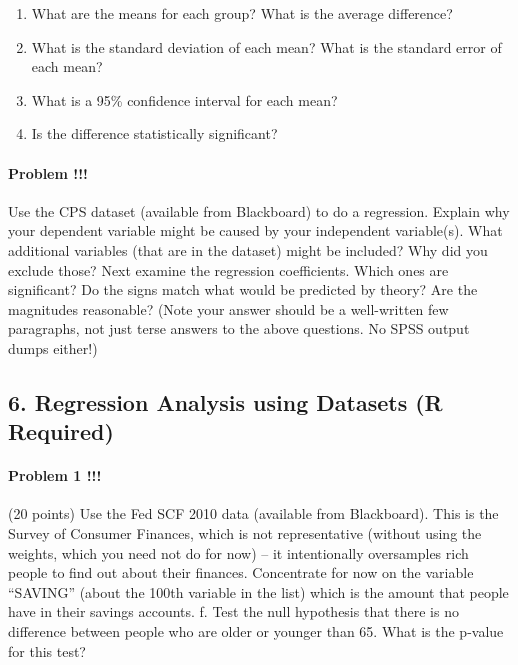 \documentclass[]{article}
\providecommand{\tightlist}{%
  \setlength{\itemsep}{0pt}\setlength{\parskip}{0pt}}
\let\oldparagraph\paragraph
\renewcommand{\paragraph}[1]{\oldparagraph{#1}\mbox{}}
\begin{document}
\begin{enumerate}
\def\labelenumi{\alph{enumi}.}
\tightlist
\item
  What are the means for each group? What is the average difference?
\item
  What is the standard deviation of each mean? What is the standard
  error of each mean?
\item
  What is a 95\% confidence interval for each mean?
\item
  Is the difference statistically significant?
\end{enumerate}

\paragraph{Problem !!!}\label{problem-27}

Use the CPS dataset (available from Blackboard) to do a regression.
Explain why your dependent variable might be caused by your independent
variable(s). What additional variables (that are in the dataset) might
be included? Why did you exclude those? Next examine the regression
coefficients. Which ones are significant? Do the signs match what would
be predicted by theory? Are the magnitudes reasonable? (Note your answer
should be a well-written few paragraphs, not just terse answers to the
above questions. No SPSS output dumps either!)

\subsection{6. Regression Analysis using Datasets (R
Required)}\label{regression-analysis-using-datasets-r-required}

\paragraph{Problem 1 !!!}\label{problem-1-2}

(20 points) Use the Fed SCF 2010 data (available from Blackboard). This
is the Survey of Consumer Finances, which is not representative (without
using the weights, which you need not do for now) -- it intentionally
oversamples rich people to find out about their finances. Concentrate
for now on the variable ``SAVING'' (about the 100th variable in the
list) which is the amount that people have in their savings accounts. f.
Test the null hypothesis that there is no difference between people who
are older or younger than 65. What is the p-value for this test?
\end{document}
